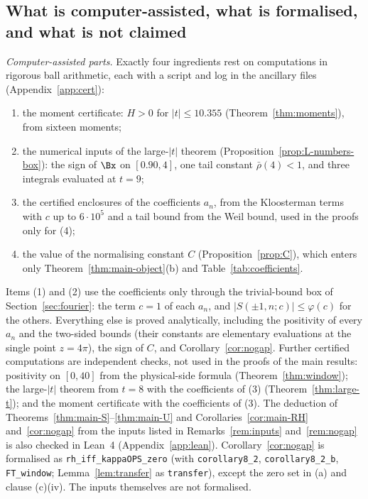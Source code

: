 \subsection{What is computer-assisted, what is formalised, and what is not claimed}\label{ssec:claims}

\emph{Computer-assisted parts.} Exactly four ingredients rest on computations in rigorous ball arithmetic, each with a script and log in the
ancillary files (Appendix~\ref{app:cert}):
\begin{enumerate}[label=(\arabic*),leftmargin=*]
\item the moment certificate: $H>0$ for $|t|\le10.355$ (Theorem~\ref{thm:moments}), from sixteen moments;
\item the numerical inputs of the large-$|t|$ theorem (Proposition~\ref{prop:L-numbers-box}): the sign of $\Bx$ on $[0.90,4]$, one tail constant
$\bar\rho(4)<1$, and three integrals evaluated at $t=9$;
\item the certified enclosures of the coefficients $a_n$, from the Kloosterman terms with $c$ up to $6\cdot10^5$ and a tail bound from the Weil
bound, used in the proofs only for (4);
\item the value of the normalising constant $C$ (Proposition~\ref{prop:C}), which enters only Theorem~\ref{thm:main-object}(b) and
Table~\ref{tab:coefficients}.
\end{enumerate}
Items (1) and (2) use the coefficients only through the trivial-bound box of Section~\ref{sec:fourier}: the term $c=1$ of each $a_n$, and
$|S(\pm1,n;c)|\le\varphi(c)$ for the others. Everything else is proved analytically, including the positivity of every $a_n$ and the two-sided
bounds (their constants are elementary evaluations at the single point $z=4\pi$), the sign of $C$, and Corollary~\ref{cor:nogap}. Further
certified computations are independent checks, not used in the proofs of the main results: positivity on $[0,40]$ from the physical-side formula
(Theorem~\ref{thm:window}); the large-$|t|$ theorem from $t=8$ with the coefficients of (3) (Theorem~\ref{thm:large-t}); and the moment
certificate with the coefficients of (3). The deduction of Theorems~\ref{thm:main-S}--\ref{thm:main-U} and
Corollaries~\ref{cor:main-RH} and~\ref{cor:nogap} from the inputs listed in Remarks~\ref{rem:inputs} and~\ref{rem:nogap} is also checked in
Lean~4 (Appendix~\ref{app:lean}). Corollary~\ref{cor:nogap} is formalised as \texttt{rh\_iff\_kappaOPS\_zero} (with \texttt{corollary8\_2},
\texttt{corollary8\_2\_b}, \texttt{FT\_window}; Lemma~\ref{lem:transfer} as \texttt{transfer}), except the zero set in (a) and clause (c)(iv).
The inputs themselves are not formalised.

